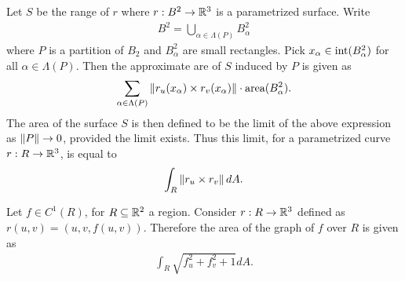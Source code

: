 Let $S$ be the range of $r$ where $r:B^{2} \to \mathbb{R}^{3}$ is a parametrized surface. Write
\begin{align}
    B^{2} = \bigcup_{\alpha \in \Lambda(P)} B_{\alpha}^{2}
\end{align}
where $P$ is a partition of $B_{2}$ and $B_{\alpha}^{2}$ are small rectangles. Pick $x_{\alpha} \in \operatorname{int}(B_{\alpha}^{2})$ for all $\alpha \in \Lambda(P)$. Then the approximate are of $S$ induced by $P$ is given as
\begin{align}
    \sum_{\alpha \in \Lambda(P)} \left\lVert r_{u}(x_{\alpha}) \times r_{v}(x_{\alpha})\right\rVert \cdot \text{area}(B_{\alpha}^{2}).
\end{align}
The area of the surface $S$ is then defined to be the limit of the above expression as $\left\lVert P\right\rVert \to 0$, provided the limit exists. Thus this limit, for a parametrized curve $r:R \to \mathbb{R}^{3}$, is equal to
\begin{align}
    \int_{R} \left\lVert r_{u} \times r_{v}\right\rVert dA.
\end{align}
\begin{example}
    Let $f \in C^{1}(R)$, for $R \subseteq \mathbb{R}^{2}$ a region.
    Consider $r:R \to \mathbb{R}^{3}$ defined as $r(u,v) = (u,v,f(u,v))$. Therefore the area of the graph of $f$ over $R$ is given as
    \begin{align}
        \int_{R}\sqrt{f_{u}^{2} + f_{v}^{2} + 1} dA.
    \end{align}
\end{example}
